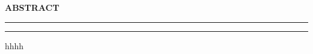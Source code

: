 \newpage
\thispagestyle{empty}

\begin{center}
\textbf{\LARGE{ABSTRACT}}
\vspace{.1in}\hrule
\vspace{.05in}\hrule
\vspace{.4in}
\end{center}
\begin{justifying}
hhhh\\
\end{justifying}
